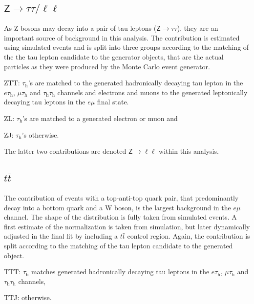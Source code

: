 %
\subsection{$\mathsf{Z\rightarrow\tau\tau/\ell\ell}$}
As Z bosons may decay into a pair of tau leptons ($\mathsf{Z\rightarrow \tau\tau}$), they are an important source of background in this analysis. The contribution is estimated using simulated events and is split into three groups according to the matching of the 
the tau lepton candidate to the generator objects, that are the actual particles as they were produced by the Monte Carlo event generator.
\begin{ct_version_list}
    \item ZTT: $\tau_\text{h}$'s are matched to the generated hadronically decaying tau lepton in the $e\tau_\text{h}$, $\mu\tau_\text{h}$ and $\tau_\text{h}\tau_\text{h}$ channels and electrons and muons to the 
    generated leptonically decaying tau leptons in the $e\mu$ final state.
    \item ZL: $\tau_\text{h}$'s are matched to a generated electron or muon and
    \item ZJ: $\tau_\text{h}$'s otherwise.
\end{ct_version_list}
The latter two contributions are denoted $\mathsf{Z\rightarrow \ell\ell}$ within this analysis.

\subsection{$t\bar{t}$}

The contribution of events with a  top-anti-top quark pair, that predominantly decay into a bottom quark and a W boson,
is the largest background in the $e\mu$ channel. The shape of the distribution is fully taken from simulated events. A first estimate of the normalization
is taken from simulation, but later dynamically adjusted in the final fit by including a $t\bar{t}$ control region. 
Again, the contribution is split according to the matching of the tau lepton candidate to the generated object.
\begin{ct_version_list}
    \item TTT: $\tau_\text{h}$ matches generated hadronically decaying tau leptons in the $e\tau_\text{h}$, $\mu\tau_\text{h}$ and $\tau_\text{h}\tau_\text{h}$ channels,
    \item TTJ: otherwise.
\end{ct_version_list}

